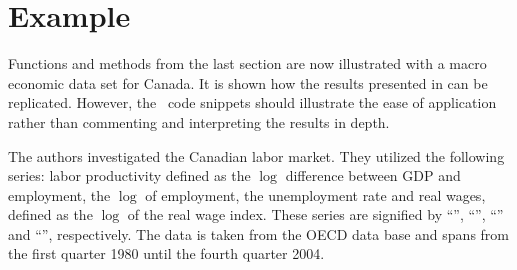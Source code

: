 \documentclass[nojss]{jss}
\begin{document}
\section{Example}
\label{example}
Functions and methods from the last section are now illustrated with a
macro economic data set for Canada. It is shown how the results
presented in \cite{BRE2004} can be replicated. However, the
~code snippets should illustrate the ease of application
rather than commenting and interpreting the results in depth.

The authors investigated the Canadian labor market. They utilized the
following series: labor productivity defined as the $\log$ difference
between GDP and employment, the $\log$ of employment, the unemployment
rate and real wages, defined as the $\log$ of the real wage index. These
series are signified by ``'', ``'', ``'' and ``'',
respectively. The data is taken from the OECD data base and spans from
the first quarter 1980 until the fourth quarter 2004.
\end{document}
